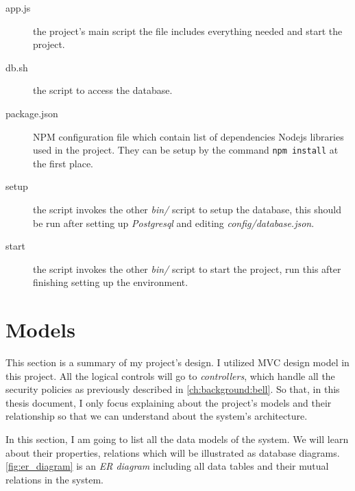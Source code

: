 \begin{description}
\item[app.js] the project's main script \ie the file includes everything needed and start the project.
\item[db.sh] the script to access the database.
\item[package.json] NPM configuration file which contain list of dependencies Nodejs libraries used in the project.
They can be setup by the command \lstinline|npm install| at the first place.
\item[setup] the script invokes the other \emph{bin/} script to setup the database, this should be run after setting up \emph{Postgresql} and editing \emph{config/database.json}.
\item[start] the script invokes the other \emph{bin/} script to start the project, run this after finishing setting up the environment.

\end{description}


\section{Models}
\label{ch:implementation:models}

This section is a summary of my project's design.
I utilized MVC design model in this project.
All the logical controls will go to \emph{controllers}, which handle all the security policies as previously described in \autoref{ch:background:bell}.
So that, in this thesis document, I only focus explaining about the project's models and their relationship so that we can understand about the system's architecture.

In this section, I am going to list all the data models of the system.
We will learn about their properties, relations which will be illustrated as database diagrams.
\autoref{fig:er_diagram} is an \emph{ER diagram} including all data tables and their mutual relations in the system.

